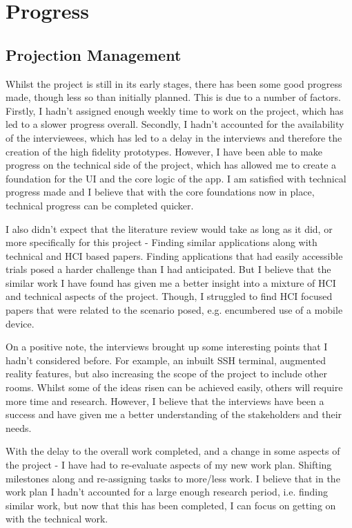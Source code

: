 \documentclass [11pt,a4paper]{article}
\begin{document}
\section{Progress}
\label{sec:progress}
\subsection{Projection Management}
\label{sec:project_management}
Whilst the project is still in its early stages, there has been some good progress made, though less so than initially planned. This is due to a number of factors. Firstly, I hadn't assigned enough weekly time  to work on the project, which has led to a slower progress overall. Secondly, I hadn't accounted for the availability of the interviewees, which has led to a delay in the interviews and therefore the creation of the high fidelity prototypes. However, I have been able to make progress on the technical side of the project, which has allowed me to create a foundation for the UI and the core logic of the app. I am satisfied with technical progress made and I believe that with the core foundations now in place, technical progress can be completed quicker.

I also didn't expect that the literature review would take as long as it did, or more specifically for this project - Finding similar applications along with technical and HCI based papers. Finding applications that had easily accessible trials posed a harder challenge than I had anticipated. But I believe that the similar work I have found has given me a better insight into a mixture of HCI and technical aspects of the project. Though, I struggled to find HCI focused papers that were related to the scenario posed, e.g. encumbered use of a mobile device. 

On a positive note, the interviews brought up some interesting points that I hadn't considered before. For example, an inbuilt SSH terminal, augmented reality features, but also increasing the scope of the project to include other rooms. Whilst some of the ideas risen can be achieved easily, others will require more time and research. However, I believe that the interviews have been a success and have given me a better understanding of the stakeholders and their needs.

With the delay to the overall work completed, and a change in some aspects of the project - I have had to re-evaluate aspects of my new work plan. Shifting milestones along and re-assigning tasks to more/less work. I believe that in the work plan I hadn't accounted for a large enough research period, i.e. finding similar work, but now that this has been completed, I can focus on getting on with the technical work.
\end{document}

